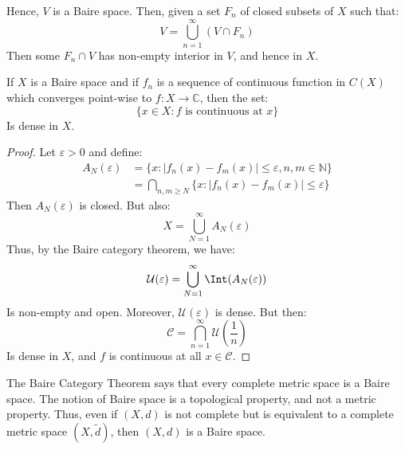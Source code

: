     Hence, $V$ is a Baire space. Then, given a set
    $F_{n}$ of closed subsets of $X$ such that:
    \begin{equation}
        V=\bigcup_{n=1}^{\infty}(V\cap{F}_{n})
    \end{equation}
    Then some $F_{n}\cap{V}$ has non-empty interior in $V$,
    and hence in $X$.
    \begin{theorem}
        If $X$ is a Baire space and if $f_{n}$ is a sequence
        of continuous function in $C(X)$ which converges
        point-wise to $f:X\rightarrow\mathbb{C}$, then
        the set:
        \begin{equation}
            \{x\in{X}:f\textrm{ is continuous at }x\}
        \end{equation}
        Is dense in $X$.
    \end{theorem}
    \begin{proof}
        Let $\varepsilon>0$ and define:
        \begin{align}
            A_{N}(\varepsilon)&=
            \{x:|f_{n}(x)-f_{m}(x)|\leq\varepsilon,
                n,m\in\mathbb{N}\}\\
            &=\bigcap_{n,m\geq{N}}
                \{x:|f_{n}(x)-f_{m}(x)|\leq\varepsilon\}
        \end{align}
        Then $A_{N}(\varepsilon)$ is closed. But also:
        \begin{equation}
            X=\bigcup_{N=1}^{\infty}A_{N}(\varepsilon)
        \end{equation}
        Thus, by the Baire category theorem, we have:
        \begin{equation}
            \mathcal{U}(\varepsilon)=
            \bigcup_{N=1}^{\infty}\Int(A_{N}(\varepsilon))
        \end{equation}
        Is non-empty and open. Moreover,
        $\mathcal{U}(\varepsilon)$ is dense. But then:
        \begin{equation}
            \mathcal{C}=\bigcap_{n=1}^{\infty}
            \mathcal{U}(\frac{1}{n})
        \end{equation}
        Is dense in $X$, and $f$ is continuous at all
        $x\in\mathcal{C}$.
    \end{proof}
    The Baire Category Theorem says that every complete metric
    space is a Baire space. The notion of Baire space is a
    topological property, and not a metric property. Thus, even
    if $(X,d)$ is not complete but is equivalent to a complete
    metric space $(X,\tilde{d})$, then $(X,d)$ is a Baire space.
